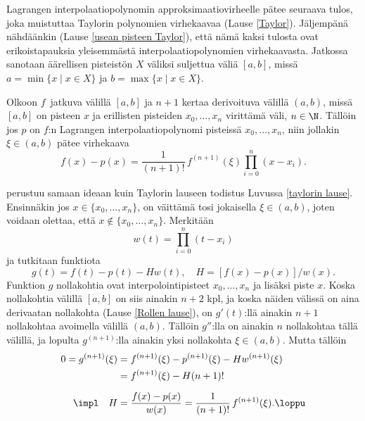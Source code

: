 Lagrangen interpolaatiopolynomin approksimaatiovirheelle pätee seuraava tulos, joka muistuttaa 
Taylorin polynomien virhekaavaa (Lause \ref{Taylor}). Jäljempänä nähdäänkin
(Lause \ref{usean pisteen Taylor}), että nämä kaksi tulosta ovat erikoistapauksia yleisemmästä
interpolaatiopolynomien virhekaavasta. Jatkossa sanotaan äärellisen pisteistön $X$ 
%
 väliksi suljettua väliä $[a,b]$, missä $a = \min \{x \mid x \in X\}$ ja 
$b = \max \{x \mid x \in X\}$.
\begin{Lause} \label{Lagrangen interpolaatiovirhe}
Olkoon $f\,$ jatkuva välillä $[a,b]$ ja $n+1$ kertaa derivoituva välillä $(a,b)$, missä $[a,b]$
on pisteen $x$ ja erillisten pisteiden $x_0,\ldots,x_n$ virittämä väli, $n\in\N$. Tällöin jos
$p$ on $f$:n Lagrangen interpolaatiopolynomi pisteissä $x_0,\ldots,x_n$, niin jollakin
$\xi \in (a,b)$ pätee virhekaava
\[
f(x)-p(x)=\frac{1}{(n+1)!}\,f^{(n+1)}(\xi) \prod_{i=0}^n (x-x_i).
\]
\end{Lause}
\tod perustuu samaan ideaan kuin Taylorin lauseen todistus Luvussa \ref{taylorin lause}.
Ensinnäkin jos $x\in\{x_0,\ldots,x_n\}$, on väittämä tosi jokaisella $\xi \in (a,b)$, joten
voidaan olettaa, että $x\notin\{x_0,\ldots,x_n\}$. Merkitään
\[
w(t)=\prod_{i=0}^n (t-x_i)
\]
ja tutkitaan funktiota
\[
g(t)=f(t)-p(t)- Hw(t),\quad H=[f(x)-p(x)]/w(x).
\]
Funktion $g$ nollakohtia ovat interpolointipisteet $x_0,\ldots,x_n$ ja lisäksi piste $x$. Koska
nollakohtia välillä $[a,b]$ on siis ainakin $n+2$ kpl, ja koska näiden välissä on aina 
derivaatan nollakohta (Lause \ref{Rollen lause}), on $g'(t)$:llä ainakin $n+1$ nollakohtaa
avoimella välillä $(a,b)$. Tällöin $g''$:lla on ainakin $n$ nollakohtaa tällä välillä, ja
lopulta $g^{(n+1)}$:lla ainakin yksi nollakohta $\xi\in (a,b)$. Mutta tällöin
\begin{align*}
0 = g^{(n+1)}(\xi) &= f^{(n+1)}(\xi)-p^{(n+1)}(\xi)-H w^{(n+1)}(\xi) \\
                   &= f^{(n+1)}(\xi)-H (n+1)! \\[2mm]
      \impl\quad H &= \frac{f(x)-p(x)}{w(x)}=\frac{1}{(n+1)!}\,f^{(n+1)}(\xi). \loppu
\end{align*}

